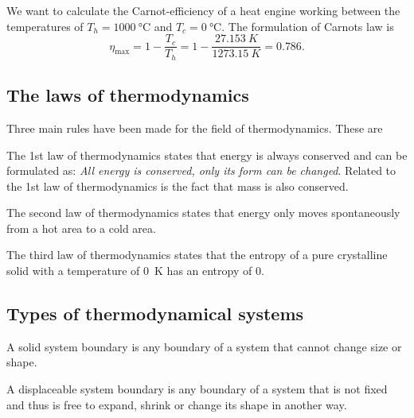 \begin{eks}
  We want to calculate the Carnot-efficiency of a heat engine working between the temperatures of $T_h = \qty{1000}{\celsius}$ and $T_c = \qty{0}{\celsius}$.
  \bigbreak
  The formulation of Carnots law is
  \[ 
  \eta_{\mathrm{max}} = 1 - \frac{T_c}{T_h} = 1 - \frac{\qty{27,153}{K}}{\qty{1273,15}{K}} = \num{0,786}  
  .\]
\end{eks}

\subsection{The laws of thermodynamics}
Three main rules have been made for the field of thermodynamics. These are

\begin{sæt}
  The 1st law of thermodynamics states that energy is always conserved and can be formulated as: \textit{All energy is conserved, only its form can be changed}. Related to the 1st law of thermodynamics is the fact that mass is also conserved.
\end{sæt}

\begin{sæt}
  The second law of thermodynamics states that energy only moves spontaneously from a hot area to a cold area. 
\end{sæt}

\begin{sæt}
  The third law of thermodynamics states that the entropy of a pure crystalline solid with a temperature of \qty{0}{K} has an entropy of 0.
\end{sæt}


\subsection{Types of thermodynamical systems}
\begin{definition}
  A solid system boundary is any boundary of a system that cannot change size or shape.
\end{definition}

\begin{definition}
  A displaceable system boundary is any boundary of a system that is not fixed and thus is free to expand, shrink or change its shape in another way.
\end{definition}

